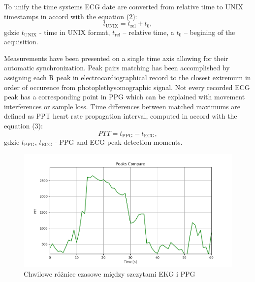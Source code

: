 \documentclass[journal]{IEEEtran}
\begin{document}
{%
To unify the time systems ECG date are converted from relative time to UNIX timestamps in accord with the equation (2):
\begin{equation}
t_{\mathrm{UNIX}} = t_{\mathrm{rel}} + t_{0},
\end{equation}
gdzie $t_{\mathrm{UNIX}}$ - time in UNIX format, $t_{\mathrm{rel}}$ – relative time, a $t_{0}$ – begining of the acquisition.

Measurements have been presented on a single time axis allowing for their automatic synchronization. Peak pairs matching has been accomplished by assigning each R peak in electrocardiographical record to the closest extremum in order of occurence from photoplethysomographic signal. Not every recorded ECG peak has a corresponding point in PPG which can be explained with movement interferences or sample loss. Time differences between matched maximums are defined as PPT heart rate propagation interval, computed in accord with the equation (3):
\begin{equation}
PTT = t_{\mathrm{PPG}} - t_{\mathrm{ECG}},
\end{equation}
gdzie $t_{\mathrm{PPG}}$, $t_{\mathrm{ECG}}$ - PPG and ECG peak detection moments. 

\newpage
\begin{figure}[htbp]
    \centering
    \includegraphics[width=1.0\linewidth]{Peaks_compare.png}
   \caption{Chwilowe różnice czasowe między szczytami EKG i PPG}
    \label{fig:PTT}
\end{figure}

}
\end{document}
